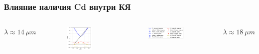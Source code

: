 \documentclass[9pt,pdf]{beamer}
\begin{document}
  \begin{frame}
    \frametitle{Влияние наличия Cd внутри КЯ}

    \begin{columns}
        \begin{center}$\lambda\approx 14~\mu m$\end{center}

        \begin{figure}[t]
        \begin{center}
          \includegraphics[width=0.8\textwidth]{./images/14um_p_vs_i.pdf}
        \end{center}
        \end{figure}

        \begin{figure}[b]
        \begin{center}
          \includegraphics[width=0.8\textwidth]{./images/legend.png} 
        \end{center}
        \end{figure}


        \begin{center}$\lambda\approx 18~\mu m$\end{center}
        

\end{columns}
\end{frame}
\end{document}
